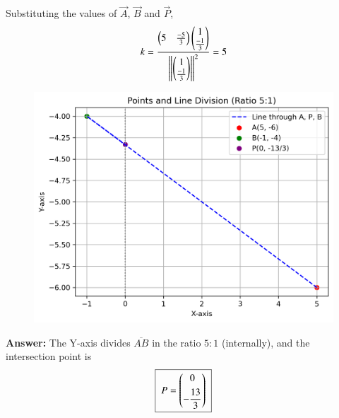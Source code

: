 \documentclass[journal]{IEEEtran}
\begin{document}
Substituting the values of $\vec{A}$, $\vec{B}$ and $\vec{P}$,
\begin{align}
k=\frac{\myvec{5 & \frac{-5}{3}}\myvec{1 \\ \frac{-1}{3}}}{\norm{\myvec{1 \\ \frac{-1}{3}}}^2}=5
\end{align}



\begin{figure}[H]
    \centering
    \includegraphics[width=0.5\columnwidth]{figs/fig1.png}
    \caption{}
    \label{fig:fig1}
\end{figure}



\textbf{Answer:} The Y-axis divides \(\overline{AB}\) in the ratio \(5:1\) (internally), and the intersection point is
\begin{align}
\boxed{\;P=\myvec{0\\[4pt]-\dfrac{13}{3}}\;}
\end{align}
\end{document}
